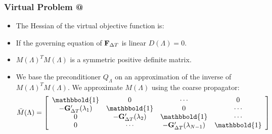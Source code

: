 \documentclass[9pt]{beamer}
\makeatletter
\newcommand*{\rom}[1]{\expandafter\@slowromancap\romannumeral #1@}
\makeatother
\begin{document}
\begin{frame}
\frametitle{Virtual Problem \rom{2}}
\begin{itemize}
\item{The Hessian of the virtual objective function is:
}
\item<2->{If the governing equation of {\tiny$\bold F_{\Delta T}$} is linear {\small$D(\Lambda)=0$}.}
\item<4->{$M(\Lambda)^TM(\Lambda)$ is a symmetric positive definite matrix.}
\item<5->{We base the preconditioner $Q_{\Lambda}$ on an approximation of the inverse of {$M(\Lambda)^TM(\Lambda)$}. We approximate $M(\Lambda)$ using the coarse propagator:
\begin{align*}
\bar M(\Lambda)= \left[ \begin{array}{cccc}
   \mathbbold{1} & 0 & \cdots & 0 \\  
   -\bold{G}_{\Delta T}'(\lambda_{1}) & \mathbbold{1} & 0 & \cdots \\ 
   0 &-\bold{G}_{\Delta T}'(\lambda_{2}) & \mathbbold{1}  & \cdots \\
   0 &\cdots &-\bold{G}_{\Delta T}'(\lambda_{N-1}) & \mathbbold{1}  \\
   \end{array}  \right]
\end{align*}}
\end{itemize}
\end{frame}
\end{document}
